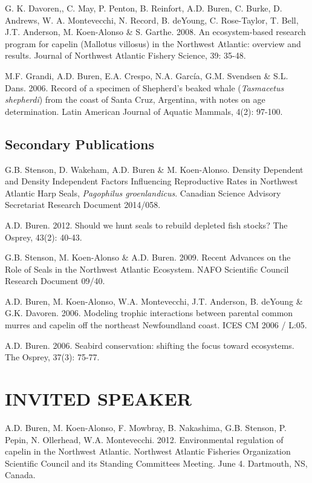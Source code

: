 \documentclass{res}
\begin{document}
\begin{resume}
\begin{hangparas}{.4in}{1}
G. K. Davoren,, C. May, P. Penton, B. Reinfort, A.D. Buren, C. Burke, D. Andrews, W. A. Montevecchi, N. Record, B. deYoung, C. Rose-Taylor, T. Bell, J.T. Anderson, M. Koen-Alonso \& S. Garthe. 2008. An ecosystem-based research program for capelin (Mallotus villosus) in the Northwest Atlantic: overview and results. Journal of Northwest Atlantic Fishery Science, 39: 35-48.

M.F. Grandi, A.D. Buren, E.A. Crespo, N.A. García, G.M. Svendsen \& S.L. Dans. 2006. Record of a specimen of Shepherd’s beaked whale (\textit{Tasmacetus shepherdi}) from the coast of Santa Cruz, Argentina, with notes on age determination. Latin American Journal of Aquatic Mammals, 4(2): 97-100.
 
\end{hangparas}

\vspace{0.2in} 

\subsection{Secondary Publications}
\begin{hangparas}{.4in}{1}
	
G.B. Stenson, D. Wakeham, A.D. Buren \& M. Koen-Alonso. Density Dependent and Density Independent Factors Influencing Reproductive Rates in Northwest Atlantic Harp Seals, \textit{Pagophilus groenlandicus}. Canadian Science Advisory Secretariat Research Document 	2014/058.

A.D. Buren. 2012. Should we hunt seals to rebuild depleted fish stocks? The Osprey, 43(2): 40-43.

G.B. Stenson, M. Koen-Alonso \& A.D. Buren. 2009. Recent Advances on the Role of Seals in the Northwest Atlantic Ecosystem. NAFO Scientific Council Research Document 09/40.

A.D. Buren, M. Koen-Alonso, W.A. Montevecchi, J.T. Anderson, B. deYoung \& G.K. Davoren. 2006. Modeling trophic interactions between parental common murres and capelin off the northeast Newfoundland coast. ICES CM 2006 / L:05.

A.D. Buren. 2006. Seabird conservation: shifting the focus toward ecosystems. The Osprey, 37(3): 75-77.

\end{hangparas}

\section{INVITED SPEAKER}
\vspace{0.1in} 
\begin{hangparas}{.4in}{1}
	A.D. Buren, M. Koen-Alonso, F. Mowbray, B. Nakashima, G.B. Stenson, P. Pepin, N. Ollerhead, W.A. Montevecchi. 2012. Environmental regulation of capelin in the Northwest Atlantic. Northwest Atlantic Fisheries Organization Scientific Council and its Standing Committees Meeting. June 4. Dartmouth, NS, Canada.
	

\end{hangparas}
\end{resume}
\end{document}
